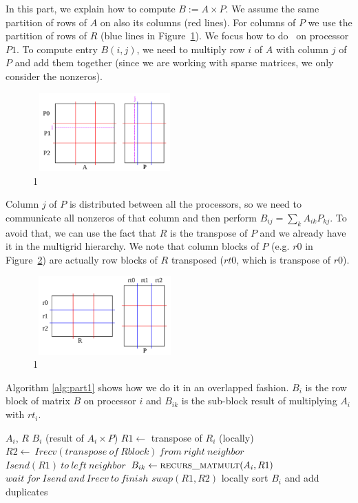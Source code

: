 In this part, we explain how to compute $B := A \times P$. We assume the same partition of rows of $A$ on also its columns (red lines). For columns of $P$ we use the partition of rows of $R$ (blue lines in Figure~\ref{fig:part1b}).
We focus how to do \mm ~on processor $P1$. To compute entry $B(i, j)$, we need to multiply row $i$ of $A$ with column $j$ of $P$ and add them together (since we are working with sparse matrices, we only consider the nonzeros).

\begin{figure}[tbh]
 \centering
 \includegraphics[width=5.5cm,height=3cm]{./figures/part1b.pdf}
 \caption{1}
 \label{fig:part1b}
\end{figure}

Column $j$ of $P$ is distributed between all the processors, so we need to communicate all nonzeros of that column and then perform $B_{ij} = \sum_{k} A_{ik} P_{kj}$. To avoid that, we can use the fact that $R$ is the transpose of $P$ and we already have it in the multigrid hierarchy. We note that column blocks of $P$ (e.g. $r0$ in Figure~\ref{fig:part1c}) are actually row blocks of $R$ transposed ($rt0$, which is transpose of $r0$).

\begin{figure}[tbh]
 \centering
 \includegraphics[width=5.5cm,height=3cm]{./figures/part1c.pdf}
 \caption{1}
 \label{fig:part1c}
\end{figure}

Algorithm \ref{alg:part1} shows how we do it in an overlapped fashion. $B_{i}$ is the row block of matrix $B$ on processor $i$ and $B_{ik}$ is the sub-block result of multiplying $A_i$ with $rt_i$.

\begin{algorithm}[H] 
  \caption{Part 1: $B_i = A_i \times P$} \label{alg:part1} 
  \begin{algorithmic}[1]
    \Require $A_i$, $R$
    \Ensure  $B_i$ (result of $A_i \times P$)
    \State $R1 \leftarrow$ transpose of $R_i$ (locally)
      \State $R2 \leftarrow\ Irecv(transpose\ of\ R block)\ from\ right\ neighbor$
      \State $Isend(R1)\ to\ left\ neighbor$
      \State $B_{ik} \leftarrow \textsc{recurs\_matmult}(A_i, R1)$ 
      \State $wait\ for\ Isend\ and\ Irecv\ to\ finish$
      \State $swap(R1,R2)$
    \EndFor
    \State locally sort $B_i$ and add duplicates
  \end{algorithmic}
\end{algorithm}



